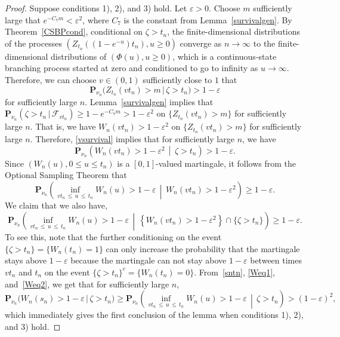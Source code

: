 \documentclass[AHL,Unicode,longabstracts,published]{cedram}
\newcommand*\eps{\varepsilon}
\renewcommand*\P{\mathbf{P}}
\newcommand\F{\mathcal{F}}
\newcommand{\1} {\mathds{1}}
\begin{document}
\begin{proof}
Suppose conditions 1), 2), and 3) hold. Let $\eps > 0$. Choose $m$ sufficiently large that $e^{-C_7 m} < \eps^2$, where $C_7$ is the constant from Lemma~\ref{survivalgen}. By Theorem~\ref{CSBPcond}, conditional on $\zeta > t_n$, the finite-dimensional distributions of the processes $(Z_{t_n}((1 - e^{-u}) t_n), u \geq 0)$ converge as $n \rightarrow \infty$ to the finite-dimensional distributions of $(\Phi(u), u \geq 0)$, which is a continuous-state branching process started at zero and conditioned to go to infinity as $u \rightarrow \infty$. Therefore, we can choose $v \in (0, 1)$ sufficiently close to $1$ that
\begin{equation}\label{vsurvival}
\P_{\nu_n}\big(Z_{t_n}(vt_n) > m \,\big|\, \zeta > t_n\big) > 1 - \eps
\end{equation}
for sufficiently large $n$. Lemma~\ref{survivalgen} implies that $\P_{\nu_n}(\zeta > t_n\,|\,\F_{vt_n}) \geq 1 - e^{-C_7 m} > 1 - \eps^2$ on $\{Z_{t_n}(vt_n) > m\}$ for sufficiently large $n$. That is, we have $W_n(vt_n) > 1 - \eps^2$ on $\{Z_{t_n}(vt_n) > m\}$ for sufficiently large $n$. Therefore, \eqref{vsurvival} implies that for sufficiently large $n$, we have
\begin{equation}\label{Weq1}
\P_{\nu_n}\left(W_n(vt_n) > 1 - \eps^2 \,\middle|\, \zeta > t_n\right) > 1 - \eps.
\end{equation}
Since $(W_n(u), 0 \leq u \leq t_n)$ is a $[0,1]$-valued martingale, it follows from the Optional Sampling Theorem that
\[
\P_{\nu_n}\left(\inf_{vt_n\,\leq\,u\,\leq\,t_n} W_n(u) > 1 - \eps \,\middle| \, W_n(vt_n) > 1 - \eps^2\right) \geq 1 - \eps.
\]
We claim that we also have,
\begin{equation}\label{Weq2}
\P_{\nu_n}\left(\inf_{vt_n\,\leq\,u\,\leq\,t_n} W_n(u) > 1 - \eps \,\middle| \, \left\{W_n(vt_n) > 1 - \eps^2\right\} \cap \{\zeta > t_n\}\right) \geq 1 - \eps.
\end{equation}
To see this, note that the further conditioning on the event $\{\zeta > t_n\} = \{W_n(t_n) = 1\}$ can only increase the probability that the martingale stays above $1 - \eps$ because the martingale can not stay above $1 - \eps$ between times $vt_n$ and $t_n$ on the event $\{\zeta > t_n\}^c = \{W_n(t_n) = 0\}$. From~\eqref{sntn}, \eqref{Weq1}, and~\eqref{Weq2}, we get that for sufficiently large $n$,
\[
\P_{\nu_n}\big(W_n(s_n) > 1 - \eps \,\big|\, \zeta > t_n\big) \geq \P_{\nu_n}\left(\inf_{vt_n\,\leq\,u\,\leq\,t_n} W_n(u) > 1 - \eps \,\middle|\, \zeta > t_n \right) > (1 - \eps)^2,
\]
which immediately gives the first conclusion of the lemma when conditions 1), 2), and 3) hold.


\end{proof}
\end{document}
